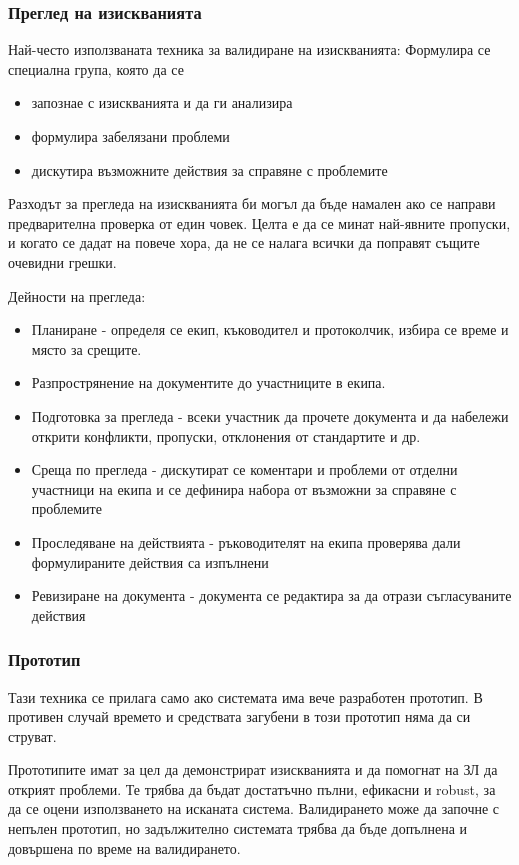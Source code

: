 \documentclass[fleqn,12pt]{article}
\begin{document}
\subsubsection{Преглед на изискванията}
Най-често използваната техника за валидиране на изискванията: Формулира се специална група, която да се

\begin{itemize}
	\item запознае с изискванията и да ги анализира
	\item формулира забелязани проблеми
	\item дискутира възможните действия за справяне с проблемите
\end{itemize}

Разходът за прегледа на изискванията би могъл да бъде намален ако се направи предварителна проверка от един човек. Целта е да се минат най-явните пропуски, и когато се дадат на повече хора, да не се налага всички да поправят същите очевидни грешки.

Дейности на прегледа:
\begin{itemize}
	\item Планиране - определя се екип, къководител и протоколчик, избира се време и място за срещите.
	\item Разпрострянение на документите до участниците в екипа.
	\item Подготовка за прегледа - всеки участник да прочете документа и да набележи открити конфликти, пропуски, отклонения от стандартите и др.
	\item Среща по прегледа - дискутират се коментари и проблеми от отделни участници на екипа и се дефинира набора от възможни за справяне с проблемите
	\item Проследяване на действията - ръководителят на екипа проверява дали формулираните действия са изпълнени
	\item Ревизиране на документа - документа се редактира за да отрази съгласуваните действия
\end{itemize}

\subsubsection{Прототип}
Тази техника се прилага само ако системата има вече разработен прототип. В противен случай времето и средствата загубени в този прототип няма да си струват.

Прототипите имат за цел да демонстрират изискванията и да помогнат на ЗЛ да открият проблеми. Те трябва да бъдат достатъчно пълни, ефикасни и robust, за да се оцени използването на исканата система. Валидирането може да започне с непълен прототип, но задължително системата трябва да бъде допълнена и довършена по време на валидирането.
\end{document}

